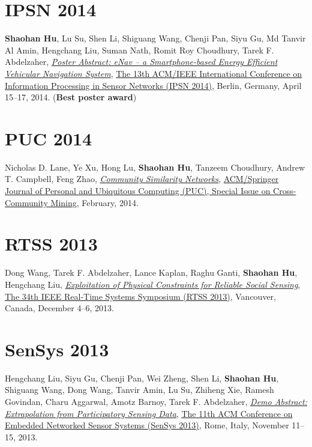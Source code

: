\section{\sc IPSN 2014}\hypertarget{hu2014ipsn}{}
\textbf{Shaohan Hu}, Lu Su, Shen Li, Shiguang Wang, Chenji Pan, Siyu Gu, Md Tanvir Al Amin, Hengchang Liu, Suman Nath, Romit Roy Choudhury, Tarek F. Abdelzaher,
\href{http://dl.acm.org/citation.cfm?id=2602374}{\emph{Poster Abstract: eNav -- a Smartphone-based Energy Efficient Vehicular Navigation System}},
\href{http://ipsn.acm.org/2014/}{\textsf{The 13th ACM/IEEE International Conference on Information Processing in Sensor Networks (IPSN 2014)}},
Berlin, Germany, April 15--17, 2014. (\textbf{Best poster award})

\section{\sc PUC 2014}\hypertarget{lane2013puc}{}
Nicholas D. Lane, Ye Xu, Hong Lu, \textbf{Shaohan Hu}, Tanzeem Choudhury, Andrew T. Campbell, Feng Zhao,
\href{http://link.springer.com/article/10.1007/s00779-013-0655-1}{\emph{Community Similarity Networks}},
\href{http://www.springer.com/computer/hci/journal/779}{\textsf{ACM/Springer Journal of Personal and Ubiquitous Computing (PUC), Special Issue on Cross-Community Mining}},
February, 2014.

\section{\sc RTSS 2013}\hypertarget{wang2013rtss}{}
Dong Wang, Tarek F. Abdelzaher, Lance Kaplan, Raghu Ganti, \textbf{Shaohan Hu}, Hengchang Liu,
\href{http://ieeexplore.ieee.org/document/6728876}{\emph{Exploitation of Physical Constraints for Reliable Social Sensing}},
\href{http://2013.ieee-rtss.org/}{\textsf{The 34th IEEE Real-Time Systems Symposium (RTSS 2013)}},
Vancouver, Canada, December 4--6, 2013.

\section{\sc SenSys 2013}\hypertarget{liu2013sensys}{}
Hengchang Liu, Siyu Gu, Chenji Pan, Wei Zheng, Shen Li, \textbf{Shaohan Hu}, Shiguang Wang, Dong Wang, Tanvir Amin, Lu Su, Zhiheng Xie, Ramesh Govindan, Charu Aggarwal, Amotz Barnoy, Tarek F. Abdelzaher,
\href{http://portal.acm.org/citation.cfm?id=2517431}{\emph{Demo Abstract: Extrapolation from Participatory Sensing Data}},
\href{http://sensys.acm.org/2013/}{\textsf{The 11th ACM Conference on Embedded Networked Sensor Systems (SenSys 2013)}},
Rome, Italy, November 11--15, 2013.

